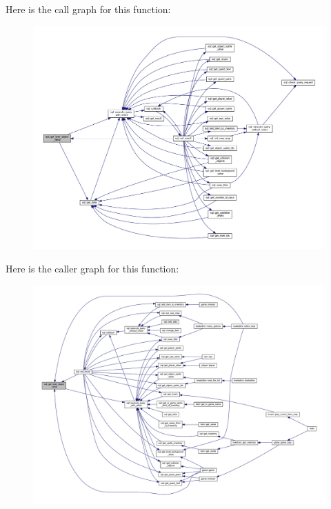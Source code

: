 Here is the call graph for this function\+:
\nopagebreak
\begin{figure}[H]
\begin{center}
\leavevmode
\includegraphics[width=350pt]{classsql_a1dd21fbf729e949d804ba5509af2b295_cgraph}
\end{center}
\end{figure}
Here is the caller graph for this function\+:
\nopagebreak
\begin{figure}[H]
\begin{center}
\leavevmode
\includegraphics[width=350pt]{classsql_a1dd21fbf729e949d804ba5509af2b295_icgraph}
\end{center}
\end{figure}
\mbox{\label{classsql_ae959c21f71c8f9b1df8bde932a6c484b}} 
